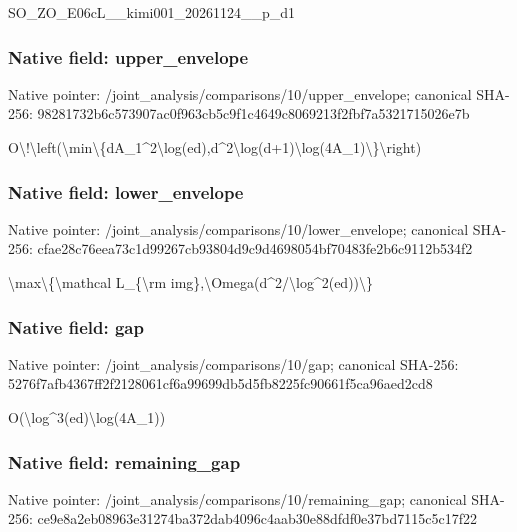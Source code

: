 \documentclass[10pt,a4paper]{article}
\begin{document}
SO\_ZO\_E06cL\_\_kimi001\_20261124\_\_p\_d1


\subsubsection{Native field: upper\_envelope}


Native pointer: /joint\_analysis/comparis\allowbreak{}ons/10/upper\_envelope; canonical SHA-256: 98281732b6c573907ac0f963\allowbreak{}cb5c9f1c4649c8069213f2fb\allowbreak{}f7a5321715026e7b


O\textbackslash{}!\textbackslash{}left(\textbackslash{}min\textbackslash{}\{dA\_1\textasciicircum{}2\textbackslash{}lo\allowbreak{}g(ed),d\textasciicircum{}2\textbackslash{}log(d+1)\textbackslash{}log(4\allowbreak{}A\_1)\textbackslash{}\}\textbackslash{}right)


\subsubsection{Native field: lower\_envelope}


Native pointer: /joint\_analysis/comparis\allowbreak{}ons/10/lower\_envelope; canonical SHA-256: cfae28c76eea73c1d99267cb\allowbreak{}93804d9c9d4698054bf70483\allowbreak{}fe2b6c9112b534f2


\textbackslash{}max\textbackslash{}\{\textbackslash{}mathcal L\_\{\textbackslash{}rm img\},\textbackslash{}Omega(d\textasciicircum{}2/\textbackslash{}log\textasciicircum{}2(ed))\textbackslash{}\}


\subsubsection{Native field: gap}


Native pointer: /joint\_analysis/comparisons/10/gap; canonical SHA-256: 5276f7afb4367ff2f2128061\allowbreak{}cf6a99699db5d5fb8225fc90\allowbreak{}661f5ca96aed2cd8


O(\textbackslash{}log\textasciicircum{}3(ed)\textbackslash{}log(4A\_1))


\subsubsection{Native field: remaining\_gap}


Native pointer: /joint\_analysis/comparis\allowbreak{}ons/10/remaining\_gap; canonical SHA-256: ce9e8a2eb08963e31274ba37\allowbreak{}2dab4096c4aab30e88dfdf0e\allowbreak{}37bd7115c5c17f22
\end{document}
